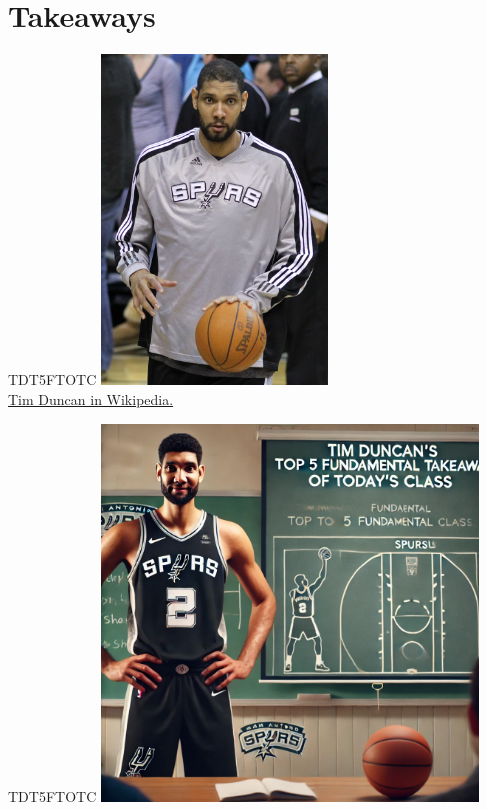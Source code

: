 \documentclass{beamer}
\begin{document}
\section*{Takeaways}

\begin{frame}{TDT5FTOTC}
    \centering
    \includegraphics[width=0.45\textwidth]{figures/td.jpg}\\
    \href{https://en.wikipedia.org/wiki/Tim_Duncan}{Tim Duncan in Wikipedia.}
\end{frame}

\begin{frame}{TDT5FTOTC}
    \centering
    \includegraphics[width=0.75\textwidth]{figures/tim.png}
\end{frame}
\end{document}
